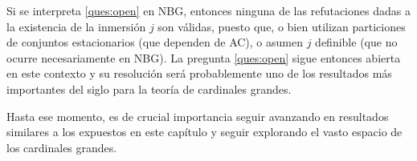 \documentclass
[
  12pt,
  letterpaper,
  openany,
  oneside,
]{book}
\begin{document}
Si se interpreta \ref{ques:open} en NBG, entonces
ninguna de las refutaciones dadas a la existencia de la inmersión $j$
son válidas, puesto que, o bien utilizan particiones de conjuntos estacionarios
(que dependen de AC), o asumen $j$ definible (que no ocurre necesariamente
en NBG). La pregunta \ref{ques:open} sigue entonces abierta en este contexto
y su resolución será probablemente uno de los resultados más importantes
del siglo para la teoría de cardinales grandes.

Hasta ese momento, es de crucial importancia seguir avanzando en resultados
similares a los expuestos en este capítulo y seguir explorando el vasto espacio
de los cardinales grandes.

\fi
\backmatter
\ifreferencias
\singlespacing
{}
\printbibliography[heading=mybib]
\fi
\end{document}
